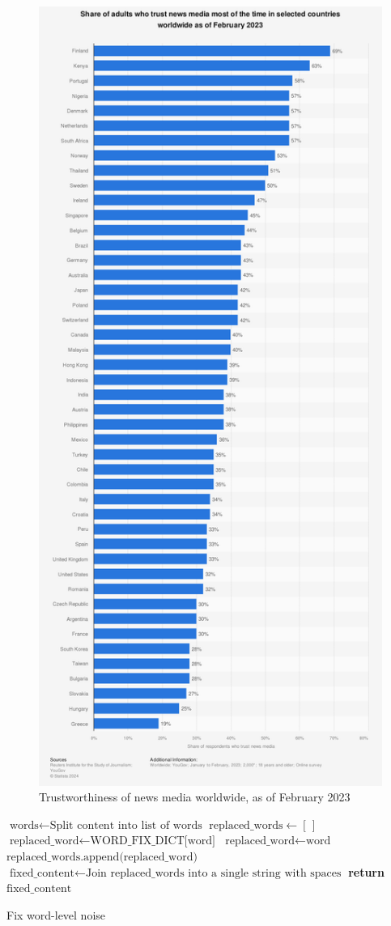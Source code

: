 \begin{figure}[htbp]
    \centering
    \includegraphics[width=0.6\linewidth]{images/statistic_id308468_trustworthiness-of-news-media-worldwide-2023.png}
    \caption{Trustworthiness of news media worldwide, as of February 2023 \cite{reuters-2023-trust}}
    \label{fig:trustworthiness-of-news-media-worldwide-2023}
\end{figure}



\begin{algorithm}
    \begin{algorithmic}[1]
        \State $\text{words} \gets \text{Split content into list of words}$ 
        \State $\text{replaced\_words} \gets [\,]$
        \State $\text{replaced\_word} \gets \text{WORD\_FIX\_DICT[word]}$ 
        \State $\text{replaced\_word} \gets \text{word}$ 
        \EndIf
        \State $\text{replaced\_words.append(replaced\_word)}$
        \EndFor
        \State $\text{fixed\_content} \gets \text{Join replaced\_words into a single string with spaces}$
        \State \textbf{return} $\text{fixed\_content}$
        \EndProcedure
    \end{algorithmic}
    \caption{Fix word-level noise}
    \label{alg:word_level_noise_fix}
\end{algorithm}

